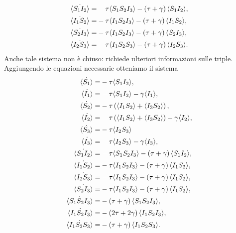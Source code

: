 \begin{equation*}
\begin{aligned}
	\dot{\angol{S_1I_2}}=&\spa\tau\angol{S_1S_2I_3} - \tonde{ \tau + \gamma}\angol{S_1 I_2},
\\
	\dot{\angol{I_1S_2}}=&-\tau\angol{I_1S_2I_3} - \tonde{ \tau + \gamma}\angol{I_1 S_2},
\\
	\dot{\angol{S_2I_3}}=&-\tau\angol{I_1S_2I_3} - \tonde{ \tau + \gamma}\angol{S_2 I_3},
\\
	\dot{\angol{I_2S_3}}=&\spa\tau\angol{I_1S_2S_3} - \tonde{ \tau + \gamma}\angol{I_2 S_3}.
	\end{aligned}
\end{equation*}
Anche tale sistema non \`e chiuso: richiede  ulteriori informazioni sulle triple.\\
Aggiungendo le equazioni necessarie otteniamo il sistema 
\begin{equation}
\label{3nodi}
\begin{aligned}
	\dot{\angol {S_1}} =& -\tau \angol{ S_1 I_2},
\\ 
	\dot{\angol {I_1}} =&\spa \tau \angol{ S_1 I_2}-\gamma \angol{I_1}, 
\\ 
	\dot{\angol {S_2}} = & -\tau \tonde{ \angol{ I_1 S_2}+ \angol{I_3S_2}},
\\
	\dot{\angol {I_2}} = &\spa \tau \tonde{ \angol{ I_1 S_2} + \angol{I_3S_2}}-\gamma \angol{I_2}, 
\\ 
	\dot{\angol {S_3}} = & -\tau \angol{ I_2 S_3}
\\
	\dot{\angol {I_3}} = & \spa \tau  \angol{ I_2 S_3}-\gamma \angol{I_3},	
\\
	\dot{\angol{S_1I_2}}=& \spa\tau\angol{S_1S_2I_3} - \tonde{ \tau + \gamma}\angol{S_1 I_2},
\\
	\dot{\angol{I_1S_2}}=&-\tau\angol{I_1S_2I_3} - \tonde{ \tau + \gamma}\angol{I_1 S_2},
\\ 
	\dot{\angol{I_2S_3}}=&\spa\tau\angol{I_1S_2I_3} - \tonde{ \tau + \gamma}\angol{I_1 S_2},
\\
	\dot{\angol{S_2I_3}}=&-\tau\angol{I_1S_2I_3} - \tonde{ \tau + \gamma}\angol{I_1 S_2},
\\
	\dot{\angol{S_1S_2I_3}}=&-\tonde{\tau + \gamma}\angol{S_1S_2I_3},
\\
	\dot{\angol{I_1S_2I_3}}=&-\tonde{2\tau + 2\gamma}\angol{I_1S_2I_3},
\\
	\dot{\angol{I_1S_2S_3}}=&-\tonde{\tau + \gamma}\angol{I_1S_2S_3}.
 \end{aligned}
\end{equation}
